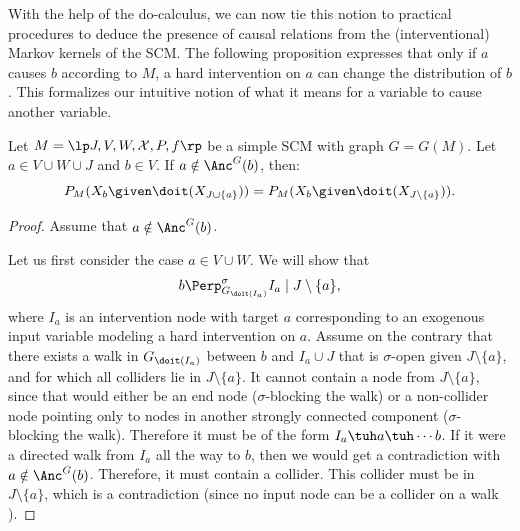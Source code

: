 With the help of the do-calculus, we can now tie this notion to practical procedures 
to deduce the presence of causal relations from the (interventional) Markov kernels of the SCM.
The following proposition expresses that only if $a$ causes $b$ according to $M$, a
hard intervention on $a$ can change the distribution of $b$. This formalizes our intuitive notion of what it means for
a variable to cause another variable.
\begin{Prp}\label{prp:scm_causes_separation}
  Let $M = \lt \Sin, \Send, \Srnd, \CX, P, f \rt$ be a simple SCM with graph $G = G(M)$.
  Let $a \in V \cup W \cup J$ and $b \in V$.
  If $a \notin \Anc^G(b)$, then:
  $$P_{M}(X_b \given \doit(X_{J\cup \{a\}})) = P_{M}(X_b \given \doit(X_{J\setminus \{a\}})).$$
\end{Prp}
\begin{proof}
  Assume that $a \notin \Anc^G(b)$. 
  
  Let us first consider the case $a \in V \cup W$. We will show that
  $$b \Perp^\sigma_{G_{\doit(I_a)}} I_a \mid J \setminus \{a\},$$
  where $I_a$ is an intervention node with target $a$ corresponding to an exogenous input variable modeling a hard intervention on $a$.
  Assume on the contrary that there exists a walk in $G_{\doit(I_a)}$ between $b$ and $I_a \cup J$ that is $\sigma$-open given $J \setminus \{a\}$, and for which all colliders lie in $J \setminus \{a\}$.
  It cannot contain a node from $J \setminus \{a\}$, since that would either be an end node ($\sigma$-blocking the walk) or  a non-collider node pointing only to nodes in another strongly connected component ($\sigma$-blocking the walk).
  Therefore it must be of the form $I_a \tuh a \tuh \cdots b$.
  If it were a directed walk from $I_a$ all the way to $b$, then we would get a contradiction with $a \notin \Anc^G(b)$.
  Therefore, it must contain a collider.
  This collider must be in $J \setminus \{a\}$, which is a contradiction (since no input node can be a collider on a walk ).


\end{proof}
